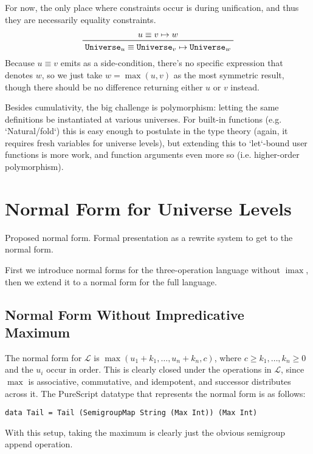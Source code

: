 \documentclass[11pt, twoside, reqno]{book}
\DeclareMathOperator{\imax}{imax}
\begin{document}
For now, the only place where constraints occur is during unification, and thus they are necessarily equality constraints.
\begin{displaymath}
\prftree{u \equiv v \mapsto w}{\texttt{Universe}_u \equiv \texttt{Universe}_v \mapsto \texttt{Universe}_w}
\end{displaymath}
Because \(u \equiv v\) emits as a side-condition, there's no specific expression that denotes \(w\), so we just take \(w = \max(u,v)\) as the most symmetric result, though there should be no difference returning either \(u\) or \(v\) instead.

Besides cumulativity, the big challenge is polymorphism: letting the same definitions be instantiated at various universes.
For built-in functions (e.g. \inHS`Natural/fold`) this is easy enough to postulate in the type theory (again, it requires fresh variables for universe levels), but extending this to \inHS`let`-bound user functions is more work, and function arguments even more so (i.e. higher-order polymorphism).

\section{Normal Form for Universe Levels}
\label{nf-uni-lvl}

Proposed normal form. Formal presentation as a rewrite system to get to the normal form.

First we introduce normal forms for the three-operation language without \(\imax\), then we extend it to a normal form for the full language.

\subsection{Normal Form Without Impredicative Maximum}

The normal form for \(\mathcal{L}\) is \(\max(u_1 + k_1, \dots, u_n + k_n, c)\), where \(c \ge k_1, \dots, k_n \ge 0\) and the \(u_i\) occur in order.
This is clearly closed under the operations in \(\mathcal{L}\), since \(\max\) is associative, commutative, and idempotent, and successor distributes across it.
The PureScript datatype that represents the normal form is as follows:
\begin{verbatim}
data Tail = Tail (SemigroupMap String (Max Int)) (Max Int)
\end{verbatim}
With this setup, taking the maximum is clearly just the obvious semigroup append operation.
\end{document}

